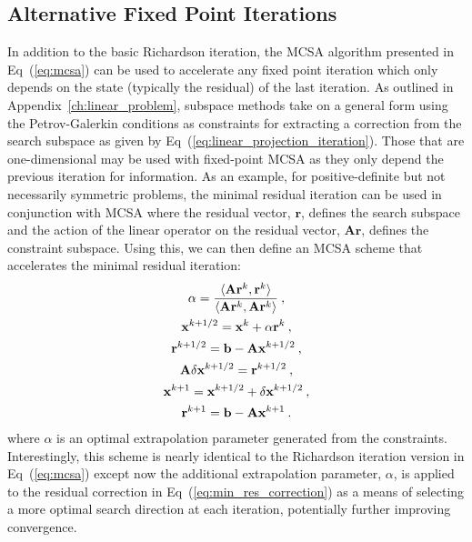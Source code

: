 \subsection{Alternative Fixed Point Iterations}
\label{subsubsec:alternative_fixed_point}
In addition to the basic Richardson iteration, the MCSA algorithm
presented in Eq~(\ref{eq:mcsa}) can be used to accelerate any fixed
point iteration which only depends on the state (typically the
residual) of the last iteration. As outlined in
Appendix~\ref{ch:linear_problem}, subspace methods take on a general
form using the Petrov-Galerkin conditions as constraints for
extracting a correction from the search subspace as given by
Eq~(\ref{eq:linear_projection_iteration}). Those that are
one-dimensional may be used with fixed-point MCSA as they only depend
the previous iteration for information. As an example, for
positive-definite but not necessarily symmetric problems, the minimal
residual iteration \cite{saad_iterative_2003} can be used in
conjunction with MCSA where the residual vector, $\mathbf{r}$, defines
the search subspace and the action of the linear operator on the
residual vector, $\mathbf{A}\mathbf{r}$, defines the constraint
subspace. Using this, we can then define an MCSA scheme that
accelerates the minimal residual iteration:
\begin{subequations}
  \begin{gather}
    \alpha = \frac{\langle \mathbf{A}\mathbf{r}^k, \mathbf{r}^k
      \rangle}{\langle \mathbf{A}\mathbf{r}^k, \mathbf{A}\mathbf{r}^k
      \rangle}\:, \\
    \mathbf{x}^{k+1/2} = \mathbf{x}^k + \alpha \mathbf{r}^k\:,
    \label{eq:min_res_correction}\\
    \mathbf{r}^{k+1/2} = \mathbf{b} - \mathbf{A}\mathbf{x}^{k+1/2}\:,\\ 
    \mathbf{A}\delta\mathbf{x}^{k+1/2} = \mathbf{r}^{k+1/2}\:,\\ 
    \mathbf{x}^{k+1} = \mathbf{x}^{k+1/2} + \delta\mathbf{x}^{k+1/2}\:,\\ 
    \mathbf{r}^{k+1} = \mathbf{b} - \mathbf{A}\mathbf{x}^{k+1}\:.
  \end{gather}
  \label{eq:mcsa_min_res}
\end{subequations}
where $\alpha$ is an optimal extrapolation parameter generated from
the constraints. Interestingly, this scheme is nearly identical to the
Richardson iteration version in Eq~(\ref{eq:mcsa}) except now the
additional extrapolation parameter, $\alpha$, is applied to the
residual correction in Eq~(\ref{eq:min_res_correction}) as a means of
selecting a more optimal search direction at each iteration,
potentially further improving convergence.

